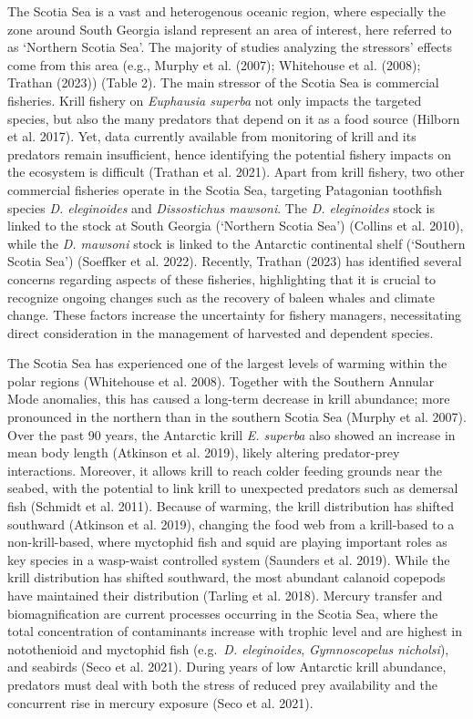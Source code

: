 \documentclass[
]{article}
\begin{document}
The Scotia Sea is a vast and heterogenous oceanic region, where
especially the zone around South Georgia island represent an area of
interest, here referred to as `Northern Scotia Sea'. The majority of
studies analyzing the stressors' effects come from this area (e.g.,
Murphy et al. (2007); Whitehouse et al. (2008); Trathan (2023)) (Table
2). The main stressor of the Scotia Sea is commercial fisheries. Krill
fishery on \emph{Euphausia superba} not only impacts the targeted
species, but also the many predators that depend on it as a food source
(Hilborn et al. 2017). Yet, data currently available from monitoring of
krill and its predators remain insufficient, hence identifying the
potential fishery impacts on the ecosystem is difficult (Trathan et al.
2021). Apart from krill fishery, two other commercial fisheries operate
in the Scotia Sea, targeting Patagonian toothfish species \emph{D.
eleginoides} and \emph{Dissostichus mawsoni}. The \emph{D. eleginoides}
stock is linked to the stock at South Georgia (`Northern Scotia Sea')
(Collins et al. 2010), while the \emph{D. mawsoni} stock is linked to
the Antarctic continental shelf (`Southern Scotia Sea') (Soeffker et al.
2022). Recently, Trathan (2023) has identified several concerns
regarding aspects of these fisheries, highlighting that it is crucial to
recognize ongoing changes such as the recovery of baleen whales and
climate change. These factors increase the uncertainty for fishery
managers, necessitating direct consideration in the management of
harvested and dependent species.

The Scotia Sea has experienced one of the largest levels of warming
within the polar regions (Whitehouse et al. 2008). Together with the
Southern Annular Mode anomalies, this has caused a long-term decrease in
krill abundance; more pronounced in the northern than in the southern
Scotia Sea (Murphy et al. 2007). Over the past 90 years, the Antarctic
krill \emph{E. superba} also showed an increase in mean body length
(Atkinson et al. 2019), likely altering predator-prey interactions.
Moreover, it allows krill to reach colder feeding grounds near the
seabed, with the potential to link krill to unexpected predators such as
demersal fish (Schmidt et al. 2011). Because of warming, the krill
distribution has shifted southward (Atkinson et al. 2019), changing the
food web from a krill-based to a non-krill-based, where myctophid fish
and squid are playing important roles as key species in a wasp-waist
controlled system (Saunders et al. 2019). While the krill distribution
has shifted southward, the most abundant calanoid copepods have
maintained their distribution (Tarling et al. 2018). Mercury transfer
and biomagnification are current processes occurring in the Scotia Sea,
where the total concentration of contaminants increase with trophic
level and are highest in notothenioid and myctophid fish (e.g.~\emph{D.
eleginoides}, \emph{Gymnoscopelus nicholsi}), and seabirds (Seco et al.
2021). During years of low Antarctic krill abundance, predators must
deal with both the stress of reduced prey availability and the
concurrent rise in mercury exposure (Seco et al. 2021).
\end{document}
